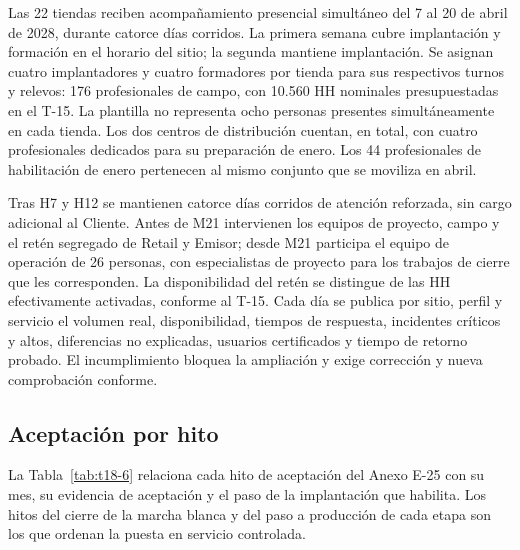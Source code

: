 \documentclass[11pt]{article}
\begin{document}
Las 22 tiendas reciben acompañamiento presencial simultáneo del 7 al 20 de abril de 2028, durante catorce días corridos. La primera semana cubre implantación y formación en el horario del sitio; la segunda mantiene implantación. Se asignan cuatro implantadores y cuatro formadores por tienda para sus respectivos turnos y relevos: 176 profesionales de campo, con 10.560 HH nominales presupuestadas en el T-15. La plantilla no representa ocho personas presentes simultáneamente en cada tienda. Los dos centros de distribución cuentan, en total, con cuatro profesionales dedicados para su preparación de enero. Los 44 profesionales de habilitación de enero pertenecen al mismo conjunto que se moviliza en abril.

Tras H7 y H12 se mantienen catorce días corridos de atención reforzada, sin cargo adicional al Cliente. Antes de M21 intervienen los equipos de proyecto, campo y el retén segregado de Retail y Emisor; desde M21 participa el equipo de operación de 26 personas, con especialistas de proyecto para los trabajos de cierre que les corresponden. La disponibilidad del retén se distingue de las HH efectivamente activadas, conforme al T-15. Cada día se publica por sitio, perfil y servicio el volumen real, disponibilidad, tiempos de respuesta, incidentes críticos y altos, diferencias no explicadas, usuarios certificados y tiempo de retorno probado. El incumplimiento bloquea la ampliación y exige corrección y nueva comprobación conforme.

\subsection*{Aceptación por hito}

La Tabla~\ref{tab:t18-6} relaciona cada hito de aceptación del Anexo E-25 con su mes, su evidencia de aceptación y el paso de la implantación que habilita. Los hitos del cierre de la marcha blanca y del paso a producción de cada etapa son los que ordenan la puesta en servicio controlada.
\end{document}
